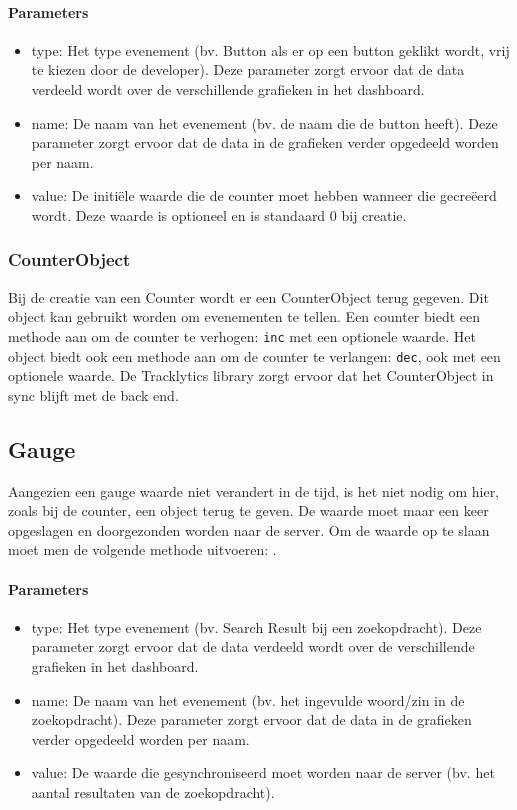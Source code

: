\paragraph{Parameters}
\begin{itemize}
\item type: Het type evenement (bv. Button als er op een button geklikt wordt, vrij te kiezen door de developer). Deze parameter zorgt ervoor dat de data verdeeld wordt over de verschillende grafieken in het dashboard.
\item name: De naam van het evenement (bv. de naam die de button heeft). Deze parameter zorgt ervoor dat de data in de grafieken verder opgedeeld worden per naam.
\item value: De initi\"ele waarde die de counter moet hebben wanneer die gecre\"eerd wordt. Deze waarde is optioneel en is standaard 0 bij creatie.
\end{itemize}

\subsubsection{CounterObject}
Bij de creatie van een Counter wordt er een CounterObject terug gegeven. Dit object kan gebruikt worden om evenementen te tellen. Een counter biedt een methode aan om de counter te verhogen: \texttt{inc} met een optionele waarde. Het object biedt ook een methode aan om de counter te verlangen: \texttt{dec}, ook met een optionele waarde. De Tracklytics library zorgt ervoor dat het CounterObject in sync blijft met de back end. 


\subsection{Gauge}
Aangezien een gauge waarde niet verandert in de tijd, is het niet nodig om hier, zoals bij de counter, een object terug te geven. De waarde moet maar een keer opgeslagen en doorgezonden worden naar de server. Om de waarde op te slaan moet men de volgende methode uitvoeren: \texttt{}. 

\paragraph{Parameters}
\begin{itemize}
\item type: Het type evenement (bv. Search Result bij een zoekopdracht). Deze parameter zorgt ervoor dat de data verdeeld wordt over de verschillende grafieken in het dashboard.
\item name: De naam van het evenement (bv. het ingevulde woord/zin in de zoekopdracht). Deze parameter zorgt ervoor dat de data in de grafieken verder opgedeeld worden per naam.
\item value: De waarde die gesynchroniseerd moet worden naar de server (bv. het aantal resultaten van de zoekopdracht).
\end{itemize}

